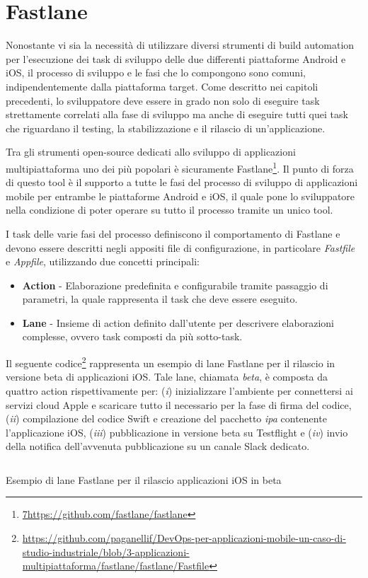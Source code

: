 \section{Fastlane}
\label{fastlane-sec}
Nonostante vi sia la necessità di utilizzare diversi strumenti di build automation per l'esecuzione dei task di sviluppo delle due differenti piattaforme Android e iOS,
il processo di sviluppo e le fasi che lo compongono sono comuni,
indipendentemente dalla piattaforma target. 
Come descritto nei capitoli precedenti, 
lo sviluppatore deve essere in grado non solo di eseguire task strettamente correlati alla fase di sviluppo ma anche di eseguire tutti quei task che riguardano il testing, 
la stabilizzazione e il rilascio di un'applicazione.

Tra gli strumenti open-source dedicati allo sviluppo di applicazioni multipiattaforma uno dei più popolari è sicuramente Fastlane\footnote{\href{7https://github.com/fastlane/fastlane}{7https://github.com/fastlane/fastlane}}. 
Il punto di forza di questo tool è il supporto a tutte le fasi del processo di sviluppo di applicazioni mobile per entrambe le piattaforme Android e iOS,
il quale pone lo sviluppatore nella condizione di poter operare su tutto il processo tramite un unico tool.

I task delle varie fasi del processo definiscono il comportamento di Fastlane e devono essere descritti negli appositi file di configurazione,
in particolare \textit{Fastfile} e \textit{Appfile},
utilizzando due concetti principali:

\begin{itemize}
    \item \textbf{Action} - Elaborazione predefinita e configurabile tramite passaggio di parametri, la quale rappresenta il task che deve essere eseguito.
    
    \item \textbf{Lane} - Insieme di action definito dall'utente per descrivere elaborazioni complesse, ovvero task composti da più sotto-task.
\end{itemize}

Il seguente codice\footnote{\href{https://github.com/paganellif/DevOps-per-applicazioni-mobile-un-caso-di-studio-industriale/blob/3-applicazioni-multipiattaforma/fastlane/fastlane/Fastfile}{https://github.com/paganellif/DevOps-per-applicazioni-mobile-un-caso-di-studio-industriale/blob/3-applicazioni-multipiattaforma/fastlane/fastlane/Fastfile}} rappresenta un esempio di lane Fastlane per il rilascio in versione beta di applicazioni iOS. 
Tale lane, 
chiamata \textit{beta}, 
è composta da quattro action rispettivamente per: 
(\textit{i}) inizializzare l'ambiente per connettersi ai servizi cloud Apple e scaricare tutto il necessario per la fase di firma del codice, 
(\textit{ii}) compilazione del codice Swift e creazione del pacchetto \textit{ipa} contenente l'applicazione iOS, 
(\textit{iii}) pubblicazione in versione beta su Testflight e 
(\textit{iv}) invio della notifica dell'avvenuta pubblicazione su un canale Slack dedicato.

\begin{listing}[H]
    \inputminted{ruby}{code/4-fastlane}
    \caption{Esempio di lane Fastlane per il rilascio applicazioni iOS in beta}
\end{listing}